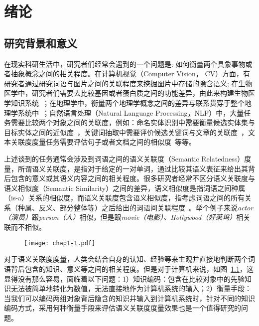 \chapter{绪论}
\label{chap:chap01}

\section{研究背景和意义}
在现实科研生活中，研究者们经常会遇到的一个问题是: 如何衡量两个具象事物或者抽象概念之间的相关程度。在计算机视觉（Computer Vision， CV）方面，有研究者通过研究词语与图片之间的关联程度来挖掘图片中存储的隐含语义\cite{iwcs/LeongM11}; 在生物医学中，研究者们需要去比较基因或者蛋白质之间的功能差异，由此来构建生物医学知识系统~\cite{bib/GuzziMGC12,bmcbi/BenabderrahmaneSPND10}；在地理学中，衡量两个地理学概念之间的差异与联系贯穿于整个地理学系统中~\cite{josis/JanowiczRK11}；自然语言处理（Natural Language Processing，NLP）中，大量任务需要比较两个对象之间的关联度，例如：命名实体识别中需要衡量候选实体集与目标实体之间的近似度~\cite{acl/HanZ10}，关键词抽取中需要评价候选关键词与文章的关联度~\cite{ijcai/ZhangFW13}，文本关联度度量任务需要评估句子或者文档之间的相似度~\cite{ijcai/YazdaniP13}等等。

上述谈到的任务通常会涉及到词语之间的语义关联度（Semantic Relatedness）度量，所谓语义关联度，是指对于给定的一对单词，通过比较其语义表征来给出其背后包含的意义或其语义内容之间的相关程度。很多研究者经常不区分语义关联度与语义相似度（Semantic Similarity）之间的差异，语义相似度是指词语之间种属（is-a）关系的相似度，而语义关联度包含语义相似度，指考虑词语之间的所有关系（种属、反义、部分整体等）之后给出的词语间关联程度~\cite{geoinformatica/BallatoreBW14}。举个例子来说\emph{actor（演员）}跟\emph{person（人）}相似，但是跟\emph{movie（电影）、Hollywood（好莱坞）}相关联而不相似。

\begin{figure}
    \centerline{\texttt{[image: chap1-1.pdf]}}
    \label{chap1-1}
\end{figure}

对于语义关联度度量，人类会结合自身的认知、经验等来主观并直接地判断两个词语背后包含的知识、意义等之间的相关程度。但是对于计算机来说，如图~\ref{chap1-1}，这显得没有那么容易，面临着以下问题：1）知识编码：包含在比较对象中的先验知识无法被简单地转化为数值，无法直接地作为计算机系统的输入；2）衡量手段：当我们可以编码两组对象背后隐含的知识并输入到计算机系统时，针对不同的知识编码方式，采用何种衡量手段来评估语义关联度度量效果也是一个值得研究的问题。

